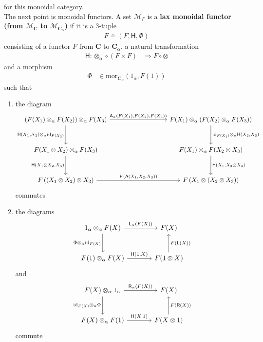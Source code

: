 for this monoidal category.
\\
The next point is monoidal functors.
A set $\mathcal{M}_{F}$ is a \textbf{lax monoidal functor (from $\mathcal{M}_{\mathbf{C}}$ to $\mathcal{M}_{\mathbf{C}_{\alpha}}$)} if it is a $3$-tuple
\begin{align*}
  F
  \doteq
  \left(
    F,
    \mathsf{H},
    \Phi
  \right)
\end{align*}
consisting of a functor $F$ from $\mathbf{C}$ to $\mathbf{C}_{\alpha}$, a natural transformation
\begin{align*}
  \mathsf{H}
  \colon
  \otimes_{\alpha}
  \circ
  \left(
    F
    \times
    F
  \right)
  &\Rightarrow
  F
  \circ
  \otimes
\end{align*}
and a morphism
\begin{align*}
  \Phi
  &\in
  \mathrm{mor}_{\mathbf{C}_{\alpha}}(1_{\alpha},F(1))
\end{align*}
such that
\begin{enumerate}
\item[(MF1)]
the diagram
\[
\begin{tikzcd}[row sep=3em, column sep=9em]
  (F(X_{1}) \otimes_{\alpha} F(X_{2}))
  \otimes_{\alpha}
  F(X_{3})
  \arrow{r}{\mathsf{A}_{\alpha}(F(X_{1}),F(X_{2}),F(X_{3}))}
  \arrow[swap]{d}{\mathsf{H}(X_{1},X_{2})\otimes_{\alpha}\mathrm{id}_{F(X_{3})}}
  &
  F(X_{1})
  \otimes_{\alpha}
  (F(X_{2}) \otimes_{\alpha} F(X_{3}))
  \arrow{d}{\mathrm{id}_{F(X_{1})} \otimes_{\alpha} \mathsf{H}(X_{2},X_{3})}
  \\
  F(X_{1} \otimes X_{2})
  \otimes_{\alpha}
  F(X_{3})
  \arrow[swap]{d}{\mathsf{H}(X_{1} \otimes X_{2},X_{3})}
  &
  F(X_{1})
  \otimes_{\alpha}
  F(X_{2} \otimes X_{3})
  \arrow{d}{\mathsf{H}(X_{1},X_{2} \otimes X_{3})}
  \\
  F
  \left(
    (X_{1} \otimes X_{2})
    \otimes
    X_{3}
  \right)
  \arrow{r}{F(\mathsf{A}(X_{1},X_{2},X_{3}))}
  &
  F
  \left(
    X_{1}
    \otimes
    (X_{2} \otimes X_{3})
  \right)
\end{tikzcd}
\]
commutes
\item[(MF2)]
the diagrams
\[
\begin{tikzcd}[sep=large]
  1_{\alpha}
  \otimes_{\alpha}
  F(X)
  \arrow{r}{\mathsf{L}_{\alpha}(F(X))}
  \arrow[swap]{d}{\Phi \otimes_{\alpha} \mathrm{id}_{F(X)}}
  &
  F(X)
  \\
  F(1)
  \otimes_{\alpha}
  F(X)
  \arrow{r}{\mathsf{H}(1,X)}
  &
  F(1 \otimes X)
  \arrow[swap]{u}{F(\mathsf{L}(X))}
\end{tikzcd}
\]
and
\[
\begin{tikzcd}[sep=large]
  F(X)
  \otimes_{\alpha}
  1_{\alpha}
  \arrow{r}{\mathsf{R}_{\alpha}(F(X))}
  \arrow[swap]{d}{\mathrm{id}_{F(X)} \otimes_{\alpha} \Phi}
  &
  F(X)
  \\
  F(X)
  \otimes_{\alpha}
  F(1)
  \arrow{r}{\mathsf{H}(X,1)}
  &
  F(X \otimes 1)
  \arrow[swap]{u}{F(\mathsf{R}(X))}
\end{tikzcd}
\]
commute
\end{enumerate}
